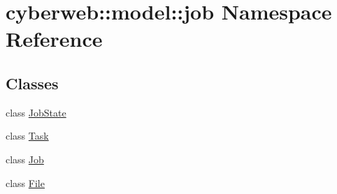 \hypertarget{namespacecyberweb_1_1model_1_1job}{\section{cyberweb\-:\-:model\-:\-:job \-Namespace \-Reference}
\label{namespacecyberweb_1_1model_1_1job}
}
\subsection*{\-Classes}
\begin{DoxyCompactItemize}
\item 
class \hyperlink{classcyberweb_1_1model_1_1job_1_1_job_state}{\-Job\-State}
\item 
class \hyperlink{classcyberweb_1_1model_1_1job_1_1_task}{\-Task}
\item 
class \hyperlink{classcyberweb_1_1model_1_1job_1_1_job}{\-Job}
\item 
class \hyperlink{classcyberweb_1_1model_1_1job_1_1_file}{\-File}
\end{DoxyCompactItemize}
